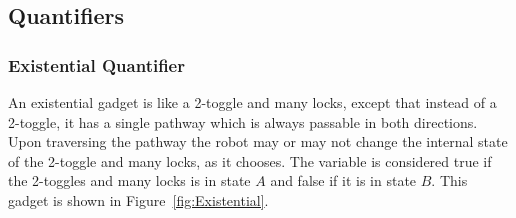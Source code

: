 

\subsection{Quantifiers}


\subsubsection{Existential Quantifier}
An existential gadget is like a 2-toggle and many locks, except that instead of a
2-toggle, it has a single pathway which is always passable in both directions. Upon traversing the pathway
the robot may or may not change the internal state of the 2-toggle and many locks, as it chooses. The variable is 
considered true if the 2-toggles and many locks is in state $A$ and false if it is in state $B$. This gadget
is shown in Figure~\ref{fig:Existential}.

